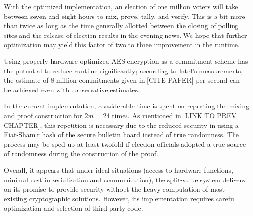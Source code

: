 With the optimized implementation, an election of one million voters will take between seven and eight hours to mix, prove, tally, and verify. This is a bit more than twice as long as the time generally allotted between the closing of polling sites and the release of election results in the evening news. We hope that further optimization may yield this factor of two to three improvement in the runtime.

Using properly hardware-optimized AES encryption as a commitment scheme has the potential to reduce runtime significantly; according to Intel's measurements, the estimate of 8 million commitments given in [CITE PAPER] per second can be achieved even with conservative estimates.

In the current implementation, considerable time is spent on repeating the mixing and proof construction for $2m = 24$ times. As mentioned in [LINK TO PREV CHAPTER], this repetition is necessary due to the reduced security in using a Fiat-Shamir hash of the secure bulletin board instead of true randomness. The process may be sped up at least twofold if election officials adopted a true source of randomness during the construction of the proof.

Overall, it appears that under ideal situations (access to hardware functions, minimal cost in serialization and communication), the split-value system delivers on its promise to provide security without the heavy computation of most existing cryptographic solutions. However, its implementation requires careful optimization and selection of third-party code.
